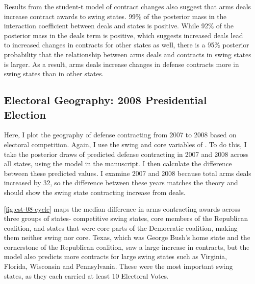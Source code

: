 \documentclass[12pt]{article}
\begin{document}
Results from the student-t model of contract changes also suggest that arms deals increase contract awards to swing states. 
99\% of the posterior mass in the interaction coefficient between deals and states is positive.
While 92\% of the posterior mass in the deals term is positive, which suggests increased deals lead to increased changes in contracts for other states as well, there is a 95\% posterior probability that the relationship between arms deals and contracts in swing states is larger. 
As a result, arms deals increase changes in defense contracts more in swing states than in other states. 


\subsection{Electoral Geography: 2008 Presidential Election}

Here, I plot the geography of defense contracting from 2007 to 2008 based on electoral competition.
Again, I use the swing and core variables of \citet{KrinerReeves2015}. 
To do this, I take the posterior draws of predicted defense contracting in 2007 and 2008 across all states, using the model in the manuscript. 
I then calculate the difference between these predicted values. 
I examine 2007 and 2008 because total arms deals increased by 32, so the difference between these years matches the theory and should show the swing state contracting increase from deals. 


\autoref{fig:est-08-cycle} maps the median difference in arms contracting awards across three groups of states- competitive swing states, core members of the Republican coalition, and states that were core parts of the Democratic coalition, making them neither swing nor core. 
Texas, which was George Bush's home state and the cornerstone of the Republican coalition, saw a large increase in contracts, but the model also predicts more contracts for large swing states such as Virginia, Florida, Wisconsin and Pennsylvania. 
These were the most important swing states, as they each carried at least 10 Electoral Votes. 
\end{document}
